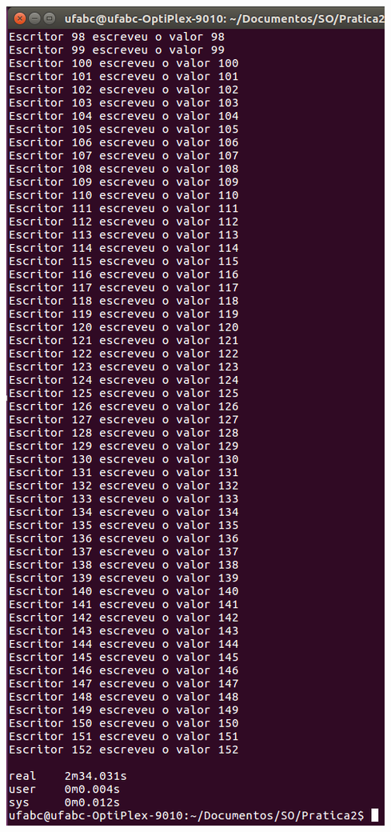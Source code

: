 \begin{minipage}{\textwidth}
\begin{minipage}[b]{0.49\textwidth}
        \label{prog5kill1png}
    \end{minipage}
    \hfill
    \begin{minipage}[b]{0.49\textwidth}
        \centering
        \includegraphics[scale=.3]{pratica2/time-prog5.png}
        \label{prog5kill2png}
    \end{minipage}
    \hspace{1em}
\end{minipage}

